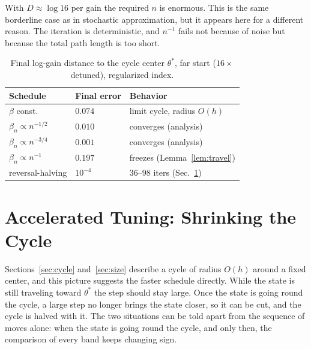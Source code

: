 \documentclass[letterpaper, 10pt, conference, twocolumn]{ieeeconf}
\begin{document}
With $D \approx \log 16$ per gain the required $n$ is enormous. This is the
same borderline case as in stochastic approximation, but it appears here for a
different reason. The iteration is deterministic, and $n^{-1}$ fails not
because of noise but because the total path length is too short.

\begin{table}[t]
\small
\centering
\caption{Final log-gain distance to the cycle center $\theta^*$, far start
($16\times$ detuned), regularized index.
}
\label{tab:schedules}
\begin{tabular}{lll}
\toprule
Schedule & Final error & Behavior \\
\midrule
$\beta$ const.           & $0.074$ & limit cycle, radius $O(h)$ \\
$\beta_n \propto n^{-1/2}$ & $0.010$ & converges (analysis) \\
$\beta_n \propto n^{-3/4}$ & $0.001$ & converges (analysis) \\
$\beta_n \propto n^{-1}$   & $0.197$ & freezes (Lemma~\ref{lem:travel}) \\
reversal-halving         & $10^{-4}$ & $36$--$98$ iters (Sec.~\ref{sec:accel}) \\
\bottomrule
\end{tabular}
\end{table}

\section{Accelerated Tuning: Shrinking the Cycle}
\label{sec:accel}

Sections~\ref{sec:cycle} and~\ref{sec:size} describe a cycle of radius $O(h)$
around a fixed center, and this picture suggests the faster schedule directly.
While the state is still traveling toward $\theta^*$ the step should stay
large. Once the state is going round the cycle, a large step no longer brings
the state closer, so it can be cut, and the cycle is halved with it. The two
situations can be told apart from the sequence of moves alone: when the state
is going round the cycle, and only then, the comparison of every band keeps
changing sign.
\end{document}
